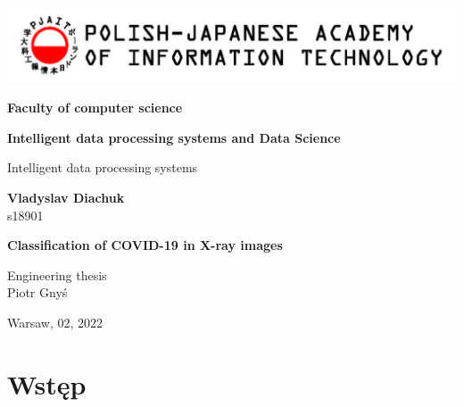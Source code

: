 \documentclass{article}
\begin{document}
\begin{titlepage}          
	\sffamily                                                                              
	\includegraphics[width=\textwidth]{pjwstk_logo_en}
	
	\vspace{1.4cm}
	
	\begin{center}
		{
			\Large
			\textbf{Faculty of computer science}
			\vspace{1.4cm}
			
			\textbf{Intelligent data processing systems and Data Science}
			\vspace{0.5cm}
			
			Intelligent data processing systems
			\vspace{1.4cm}
			
			\textbf{Vladyslav Diachuk}\\
			s18901
		}
		\vspace{1.2cm}
		
		{\huge\textbf{Classification of COVID-19 in X-ray images}}
	\end{center}
	\vspace{2cm}
	
	\begin{flushright}
		\Large
		Engineering thesis\\	
		\vspace{0.4cm}	
		Piotr Gnyś
	\end{flushright}
	\vspace{3cm}
	
	\begin{center}
		\Large
		Warsaw, 02, 2022
	\end{center}
	
\end{titlepage}

\section{Wstęp}

\end{document}
